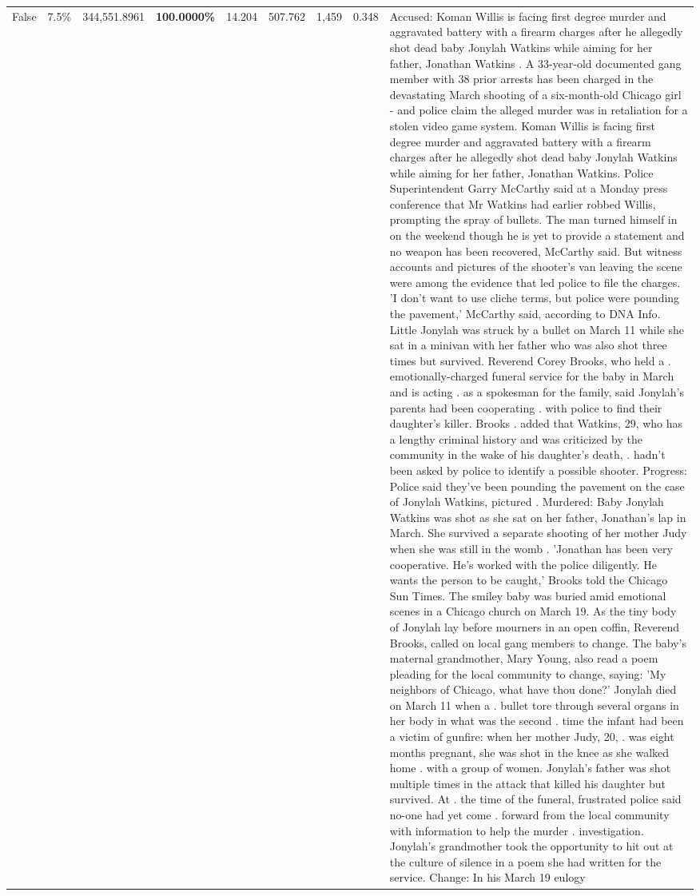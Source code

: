 \begin{table}[H]
\begin{tabular}{lllrlllll}
False & 7.5\% & 344,551.8961 & \bfseries \color{red} 100.0000\% & 14.204 & 507.762 & 1,459 & 0.348 & Accused: Koman Willis is facing first degree murder and aggravated battery with a firearm charges after he allegedly shot dead baby Jonylah Watkins while aiming for her father, Jonathan Watkins . A 33-year-old documented gang member with 38 prior arrests has been charged in the devastating March shooting of a six-month-old Chicago girl - and police claim the alleged murder was in retaliation for a stolen video game system. Koman Willis is facing first degree murder and aggravated battery with a firearm charges after he allegedly shot dead baby Jonylah Watkins while aiming for her father, Jonathan Watkins. Police Superintendent Garry McCarthy said at a Monday press conference that Mr Watkins had earlier robbed Willis, prompting the spray of bullets. The man turned himself in on the weekend though he is yet to provide a statement and no weapon has been recovered, McCarthy said. But witness accounts and pictures of the shooter's van leaving the scene were among the evidence that led police to file the charges. 'I don't want to use cliche terms, but police were pounding the pavement,' McCarthy said, according to DNA Info. Little Jonylah was struck by a bullet on March 11 while she sat in a minivan with her father who was also shot three times but survived. Reverend Corey Brooks, who held a . emotionally-charged funeral service for the baby in March and is acting . as a spokesman for the family, said Jonylah's parents had been cooperating . with police to find their daughter's killer. Brooks . added that Watkins, 29, who has a lengthy criminal history and was criticized by the community in the wake of his daughter's death, . hadn't been asked by police to identify a possible shooter. Progress: Police said they've been pounding the pavement on the case of Jonylah Watkins, pictured . Murdered: Baby Jonylah Watkins was shot as she sat on her father, Jonathan's lap in March. She survived a separate shooting of her mother Judy when she was still in the womb . 'Jonathan has been very cooperative. He's worked with the police diligently. He wants the person to be caught,' Brooks told the Chicago Sun Times. The smiley baby was buried amid emotional scenes in a Chicago church on March 19. As the tiny body of Jonylah lay before mourners in an open coffin, Reverend Brooks, called on local gang members to change. The baby's maternal grandmother, Mary Young, also read a poem pleading for the local community to change, saying: 'My neighbors of Chicago, what have thou done?' Jonylah died on March 11 when a . bullet tore through several organs in her body in what was the second . time the infant had been a victim of gunfire: when her mother Judy, 20, . was eight months pregnant, she was shot in the knee as she walked home . with a group of women. Jonylah's father was shot multiple times in the attack that killed his daughter but survived. At . the time of the funeral, frustrated police said no-one had yet come . forward from the local community with information to help the murder . investigation. Jonylah's grandmother took the opportunity to hit out at the culture of silence in a poem she had written for the service. Change: In his March 19 eulogy 
\end{tabular}
\end{table}
